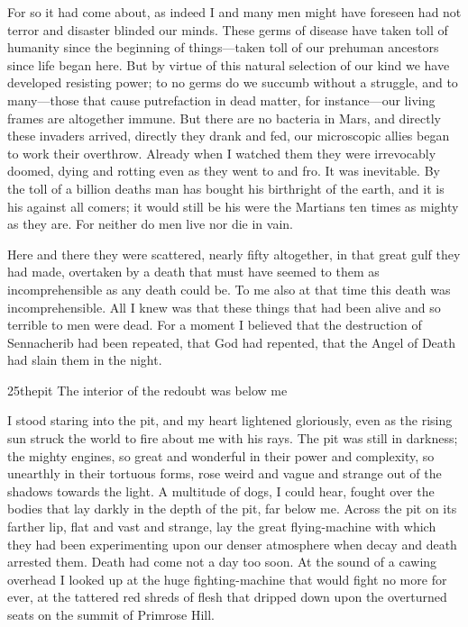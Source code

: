 For so it had come about, as indeed I and many men might have foreseen had not terror and disaster blinded our minds. These germs of disease have taken toll of humanity since the beginning of things—taken toll of our prehuman ancestors since life began here. But by virtue of this natural selection of our kind we have developed resisting power; to no germs do we succumb without a struggle, and to many—those that cause putrefaction in dead matter, for instance—our living frames are altogether immune. But there are no bacteria in Mars, and directly these invaders arrived, directly they drank and fed, our microscopic allies began to work their overthrow. Already when I watched them they were irrevocably doomed, dying and rotting even as they went to and fro. It was inevitable. By the toll of a billion deaths man has bought his birthright of the earth, and it is his against all comers; it would still be his were the Martians ten times as mighty as they are. For neither do men live nor die in vain.



Here and there they were scattered, nearly fifty altogether, in that great gulf they had made, overtaken by a death that must have seemed to them as incomprehensible as any death could be. To me also at that time this death was incomprehensible. All I knew was that these things that had been alive and so terrible to men were dead. For a moment I believed that the destruction of Sennacherib had been repeated, that God had repented, that the Angel of Death had slain them in the night.


\begin{bwbigpic}
	[1.2] 
	{25thepit} 
	{The interior of the redoubt was below me} 
\end{bwbigpic}

I stood staring into the pit, and my heart lightened gloriously, even as the rising sun struck the world to fire about me with his rays. The pit was still in darkness; the mighty engines, so great and wonderful in their power and complexity, so unearthly in their tortuous forms, rose weird and vague and strange out of the shadows towards the light. A multitude of dogs, I could hear, fought over the bodies that lay darkly in the depth of the pit, far below me. Across the pit on its farther lip, flat and vast and strange, lay the great flying-machine with which they had been experimenting upon our denser atmosphere when decay and death arrested them. Death had come not a day too soon. At the sound of a cawing overhead I looked up at the huge fighting-machine that would fight no more for ever, at the tattered red shreds of flesh that dripped down upon the overturned seats on the summit of Primrose Hill.

